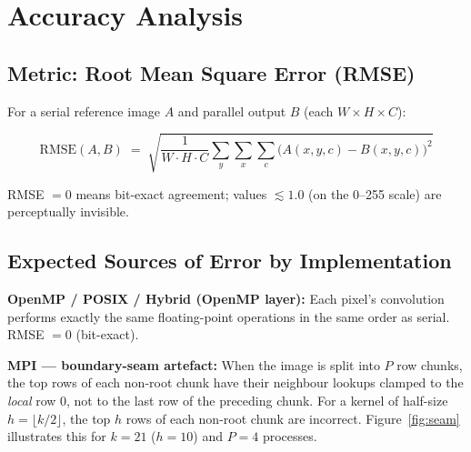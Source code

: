 \documentclass[12pt,a4paper]{article}
\begin{document}
\section{Accuracy Analysis}

\subsection{Metric: Root Mean Square Error (RMSE)}

For a serial reference image $A$ and parallel output $B$ (each $W\!\times\!H\!\times\!C$):

\begin{equation}
  \mathrm{RMSE}(A,B) \;=\;
  \sqrt{\frac{1}{W \cdot H \cdot C}
        \sum_{y}\sum_{x}\sum_{c}
        \bigl(A(x,y,c) - B(x,y,c)\bigr)^2}
  \label{eq:rmse}
\end{equation}

RMSE $= 0$ means bit-exact agreement; values $\lesssim 1.0$ (on the 0--255
scale) are perceptually invisible.

\subsection{Expected Sources of Error by Implementation}

\textbf{OpenMP / POSIX / Hybrid (OpenMP layer):}
Each pixel's convolution performs exactly the same floating-point operations
in the same order as serial. RMSE $= 0$ (bit-exact).

\textbf{MPI --- boundary-seam artefact:}
When the image is split into $P$ row chunks, the top rows of each non-root
chunk have their neighbour lookups clamped to the \emph{local} row 0, not
to the last row of the preceding chunk. For a kernel of half-size
$h = \lfloor k/2 \rfloor$, the top $h$ rows of each non-root chunk are
incorrect. Figure~\ref{fig:seam} illustrates this for $k=21$ ($h=10$) and
$P=4$ processes.
\end{document}
